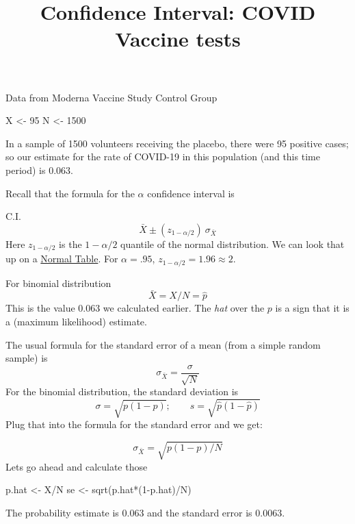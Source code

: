 \documentclass[
]{article}
\title{Confidence Interval: COVID Vaccine tests}
\author{}
\date{\vspace{-2.5em}}
\newenvironment{Shaded}{\begin{snugshade}}{\end{snugshade}}
\newcommand{\DecValTok}[1]{\textcolor[rgb]{0.00,0.00,0.81}{#1}}
\newcommand{\FunctionTok}[1]{\textcolor[rgb]{0.00,0.00,0.00}{#1}}
\newcommand{\NormalTok}[1]{#1}
\newcommand{\OtherTok}[1]{\textcolor[rgb]{0.56,0.35,0.01}{#1}}
\newcommand{\SpecialCharTok}[1]{\textcolor[rgb]{0.00,0.00,0.00}{#1}}
\begin{document}
\maketitle

Data from Moderna Vaccine Study Control Group

\begin{Shaded}
\begin{Highlighting}[]
\NormalTok{X }\OtherTok{\textless{}{-}} \DecValTok{95}
\NormalTok{N }\OtherTok{\textless{}{-}} \DecValTok{1500}
\end{Highlighting}
\end{Shaded}

In a sample of 1500 volunteers receiving the placebo, there were 95
positive cases; so our estimate for the rate of COVID-19 in this
population (and this time period) is 0.063.

Recall that the formula for the \(\alpha\) confidence interval is

C.I. \[ \bar X \pm (z_{1-\alpha/2})\ \sigma_{\bar X}\] Here
\(z_{1-\alpha/2}\) is the \(1-\alpha/2\) quantile of the normal
distribution. We can look that up on a
\href{https://pluto.coe.fsu.edu/rdemos/IntroStats/NormalCalculator.Rmd}{Normal
Table}. For \(\alpha=.95\), \(z_{1-\alpha/2}=1.96\approx 2\).

For binomial distribution \[ \bar X = X/N=\hat p\] This is the value
0.063 we calculated earlier. The \emph{hat} over the \(p\) is a sign
that it is a (maximum likelihood) estimate.

The usual formula for the standard error of a mean (from a simple random
sample) is \[ \sigma_{\bar X} = \frac{\sigma}{\sqrt{N}} \] For the
binomial distribution, the standard deviation is
\[ \sigma = \sqrt{p(1-p)}; \qquad s = \sqrt{\hat p(1-\hat p)}\] Plug
that into the formula for the standard error and we get:

\[ \sigma_{\bar X} = \sqrt{p(1-p)/N} \] Lets go ahead and calculate
those

\begin{Shaded}
\begin{Highlighting}[]
\NormalTok{p.hat }\OtherTok{\textless{}{-}}\NormalTok{ X}\SpecialCharTok{/}\NormalTok{N}
\NormalTok{se }\OtherTok{\textless{}{-}} \FunctionTok{sqrt}\NormalTok{(p.hat}\SpecialCharTok{*}\NormalTok{(}\DecValTok{1}\SpecialCharTok{{-}}\NormalTok{p.hat)}\SpecialCharTok{/}\NormalTok{N)}
\end{Highlighting}
\end{Shaded}

The probability estimate is 0.063 and the standard error is 0.0063.
\end{document}
